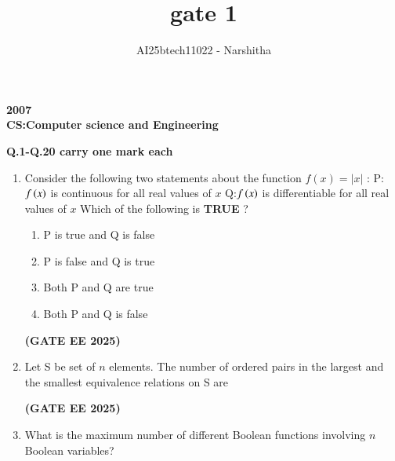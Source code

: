 \documentclass[journal,12pt,onecolumn]{IEEEtran}
\theoremstyle{remark}
\begin{document}
\title{gate 1}
\author{AI25btech11022 - Narshitha}
\maketitle
\renewcommand{\thefigure}{\theenumi}
\renewcommand{\thetable}{\theenumi}
\begin {center}
\large \textbf{2007}\\
\large \textbf{CS:Computer science and Engineering}\\
\end{center}

\begin{center}
\textbf{Q.1-Q.20 carry one mark each}
\end{center}

\begin{enumerate}
\item    Consider the following two statements about the function $f(x)=|x|$ :
\newline
P: $f\left(x\right)$ is continuous for all real values of $x$
\newline
 Q:$f\left(x\right)$ is differentiable for all real values of $x$
 \newline
 Which of the following is \textbf{TRUE} ?

\begin{enumerate}
 

    \item  P is true and Q is false
    \item  P is false and Q is true
    \item Both P  and Q are true
    \item Both P and Q is false

\end{enumerate}
\hfill \textbf{(GATE EE 2025)}
\item    Let S be set of $n$ elements. The number of ordered pairs in the largest and the smallest equivalence relations on S are

\begin{enumerate}[label=(\Alph*)]
\end{enumerate}
\hfill \textbf{(GATE EE 2025)}
    \item    What is the maximum number of different Boolean functions involving $n$ Boolean variables?
  

\end{enumerate}
\end{document}
